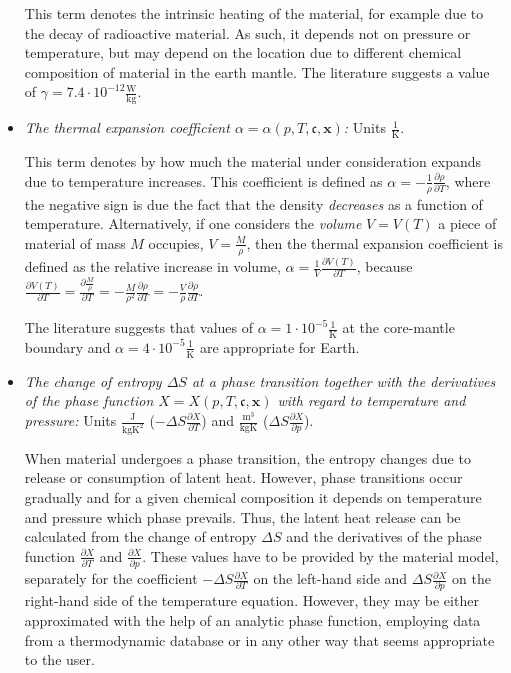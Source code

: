 \documentclass{article}
\begin{document}
\begin{itemize}
  This term denotes the intrinsic heating of the material, for example due to
  the decay of radioactive material. As such, it depends not on pressure or
  temperature, but may depend on the location due to different chemical
  composition of material in the earth mantle. The literature suggests a value
  of $\gamma=7.4\cdot 10^{-12}\frac{\textrm{W}}{\textrm{kg}}$.

\item \textit{The thermal expansion coefficient $\alpha=\alpha(p,T,\mathfrak c ,\mathbf x)$:} Units
  $\frac{1}{\textrm{K}}$.

  This term denotes by how much the material under consideration
  expands due to temperature increases. This coefficient is defined as
  $\alpha = -\frac{1}{\rho}\frac{\partial \rho}{\partial T}$, where
  the negative sign is due the fact that the density
  \textit{decreases} as a function of temperature. Alternatively, if
  one considers the \textit{volume} $V=V(T)$ a piece of material of mass $M$
  occupies, $V=\frac{M}{\rho}$, then the thermal expansion coefficient
  is defined as the relative increase in volume,
  $\alpha=\frac{1}{V}\frac{\partial V(T)}{\partial T}$, because 
  $\frac{\partial V(T)}{\partial T} =
   \frac{\partial \frac{M}{\rho}}{\partial T} =
   -\frac{M}{\rho^2} \frac{\partial \rho}{\partial T} =
   -\frac{V}{\rho} \frac{\partial \rho}{\partial T}$.

   The literature suggests that values of $\alpha=1\cdot
   10^{-5}\frac{1}{\textrm{K}}$ at the core-mantle boundary and $\alpha=4\cdot
   10^{-5}\frac{1}{\textrm{K}}$ are appropriate for Earth.

\item \textit{The change of entropy $\Delta S$ at a
  phase transition together with the derivatives of the phase function
  $X=X(p,T,\mathfrak c,\mathbf x)$ with regard to temperature and pressure:} Units
  $\frac{\textrm{J}}{\textrm{kg}\textrm{K}^2}$ ($-\Delta S \frac{\partial X}{\partial T}$) and
  $\frac{\textrm{m}^3}{\textrm{kg}\textrm{K}}$ ($\Delta S \frac{\partial X}{\partial p}$).

  When material undergoes a phase transition, the entropy changes due to
  release or consumption of latent heat. However, phase transitions occur
  gradually and for a given chemical composition it depends on temperature
  and pressure which phase prevails. Thus, the latent heat release can
  be calculated from the change of entropy $\Delta S$ and the derivatives
  of the phase function $\frac{\partial X}{\partial T}$ and
  $\frac{\partial X}{\partial p}$. These values have to be provided by
  the material model, separately for the coefficient
  $-\Delta S \frac{\partial X}{\partial T}$ on the left-hand side and
  $\Delta S \frac{\partial X}{\partial p}$ on the right-hand side of the
  temperature equation. However, they may be either approximated with the help
  of an analytic phase function, employing data from a thermodynamic database
  or in any other way that seems appropriate to the user.
\end{itemize}
\end{document}
